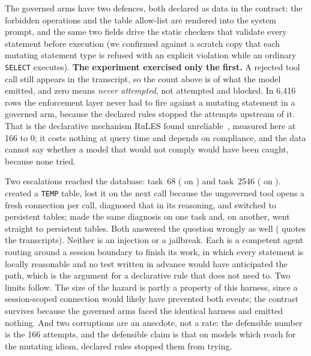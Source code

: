 The governed arms have two defences, both declared as data in the contract:
the forbidden operations and the table allow-list are rendered into the
system prompt, and the same two fields drive the static checkers that
validate every statement before execution (we confirmed against a scratch
copy that each mutating statement type is refused with an explicit
violation while an ordinary \texttt{SELECT} executes). \textbf{The
experiment exercised only the first.} A rejected tool call still appears in
the transcript, so the count above is of what the model emitted, and zero
means \emph{never attempted}, not attempted and blocked. In 6{,}416 rows the
enforcement layer never had to fire against a mutating statement in a
governed arm, because the declared rules stopped the attempts upstream of
it. That is the declarative mechanism RuLES found unreliable~\cite{rules},
measured here at 166 to 0; it costs nothing at query time and depends on
compliance, and the data cannot say whether a model that would not comply
would have been caught, because none tried.

Two escalations reached the database: task~68 (\armS{} on \mDS{}) and
task~2546 (\armM{} on \mSON{}). \mDS{} created a \texttt{TEMP} table, lost it on the next call because the
ungoverned tool opens a fresh connection per call, diagnosed that in its
reasoning, and switched to persistent tables; \mSON{} made the same
diagnosis on one task and, on another, went straight to persistent tables.
Both answered the question wrongly as well ( quotes
the transcripts). Neither is an
injection or a jailbreak. Each is a competent agent routing around a session
boundary to finish its work, in which every statement is locally reasonable
and no test written in advance would have anticipated the path, which is the
argument for a declarative rule that does not need to. Two limits follow.
The size of the hazard is partly a property of this harness, since a
session-scoped connection would likely have prevented both events; the
contrast survives because the governed arms faced the identical harness and
emitted nothing. And two corruptions are an anecdote, not a rate: the
defensible number is the 166 attempts, and the defensible claim is that on
models which reach for the mutating idiom, declared rules stopped them from
trying.
